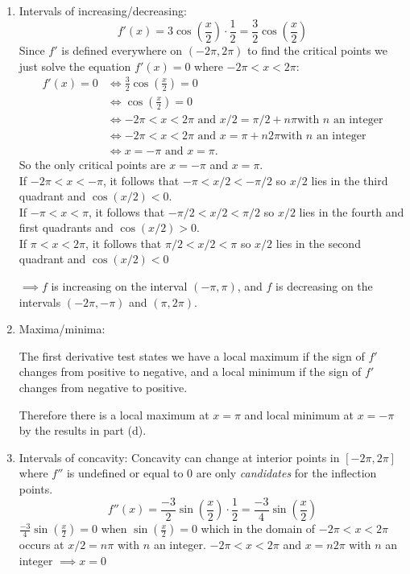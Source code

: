 \documentclass{ximera}
\begin{document}
\begin{problem}
\begin{explanation}
\begin{enumerate}
\item Intervals of increasing/decreasing:
            \[
              f'(x) = 3 \cos\left(\frac{x}{2}\right) \cdot \frac{1}{2}
              = \frac{3}{2} \cos\left(\frac{x}{2}\right)
            \]
                  Since $f'$ is defined everywhere on $(-2\pi, 2\pi)$ to find
        the critical points we just solve the equation $f'(x) = 0$
        where $-2\pi < x < 2\pi$:
        \begin{align*}
          f'(x) = 0 &\iff \frac{3}{2} \cos\left(\frac{x}{2}\right) = 0
          \\
           &\iff \cos\left(\frac{x}{2}\right) = 0 \\
          &\iff \mbox{$-2\pi < x < 2\pi$ and $x/2 = \pi/2 + n\pi$
            with $n$ an integer}\\
          &\iff \mbox{$-2\pi < x < 2\pi$ and $x = \pi + n2\pi$
            with $n$ an integer}\\
          &\iff \mbox{$x = -\pi$ and $x = \pi$.}
        \end{align*}
        So the only critical points are $x = -\pi$ and $x = \pi$.\\
        
        If $-2\pi <x< -\pi$, it follows that $-\pi<x/2<-\pi /2$ so $x/2$ lies in the third quadrant and $\cos(x/2)<0$. \\
         If $-\pi <x< \pi$, it follows that $-\pi /2<x/2<\pi /2$ so $x/2$ lies in the fourth and first quadrants and $\cos(x/2)>0$.  \\
         If $\pi <x< 2\pi$, it follows that $\pi /2<x/2<\pi$ so $x/2$ lies in the second quadrant and $\cos(x/2)<0$


         $\implies f$ is increasing on the interval $(-\pi, \pi)$, and $f$ is
        decreasing on the intervals $(-2\pi, -\pi)$ and $(\pi, 2\pi)$.
     
\item Maxima/minima:
 
      The first derivative test states
        we have a local maximum if the sign of $f'$ changes from
        positive to negative, and a local minimum if the sign of $f'$
        changes from negative to positive.

        Therefore there is a local maximum at $x = \pi$ and local
        minimum at $x = -\pi$ by the results in part (d).
        
        
     \item Intervals of concavity:
      Concavity can change at  interior points in $[-2\pi, 2\pi]$
            where $f''$ is undefined or equal to 0 are only
            \emph{candidates} for the inflection points.  
             \[
          f''(x) = \frac{-3}{2} \sin\left(\frac{x}{2}\right) \cdot
          \frac{1}{2} = \frac{-3}{4} \sin\left(\frac{x}{2}\right)
        \]
$\frac{-3}{4} \sin\left(\frac{x}{2}\right)=0$ when $\sin\left(\frac{x}{2}\right)=0$ which in the domain of $-2\pi < x < 2\pi$ occurs at $x/2 = n\pi$ with $n$ an integer.
$-2\pi < x < 2\pi$ and $x =  n2\pi$   with $n$ an integer $\implies x = 0$


\end{enumerate}
\end{explanation}
\end{problem}
\end{document}
